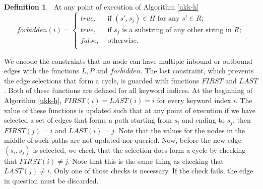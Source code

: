 \documentclass[english,twoside,censored,csm,algorithms-track-2020]{HYthesisML}
\theoremstyle{plain}
\theoremstyle{definition}
\newtheorem{definition}[theorem]{Definition}
\numberwithin{testexample}{chapter}
\begin{document}
\begin{definition}~\label{def-forbidden}
  At any point of execution of Algorithm \ref{ukk-h}
  \[
  forbidden(i) =
  \begin{cases}
    true, &\text{ if }  (s',s_j)\in H \text{ for any } s'\in R; \\
    true, &\text{ if }  s_j \text{ is a substring of any other string in } R; \\
    false, &\text{ otherwise}. \\
  \end{cases}
  \]
\end{definition}

We encode the constraints that no node can have multiple inbound or outbound edges
with the functions $L, P$ and $forbidden$. The last constraint, which prevents the edge selections
that form a cycle, is guarded with functions $FIRST$ and $LAST$. Both of these functions are defined
for all keyword indices. At the beginning of Algorithm \ref{ukk-h}, $FIRST(i) = LAST(i) = i$
for every keyword index $i$. The value of these functions is updated such that at any point of execution
if we have selected a set of edges that forms a path starting from $s_i$ and ending to $s_j$, then
$FIRST(j)=i$ and $LAST(i)=j$. Note that the values for the nodes in the middle of such paths are
not updated nor queried. Now, before the new edge $(s_i,s_j)$ is selected, we check that the
selection does form a cycle by checking that $FIRST(i) \neq j$. Note that this is the same thing
as checking that $LAST(j) \neq i$. Only one of those checks is necessary. If the check fails,
the edge in question must be discarded. 
\end{document}
